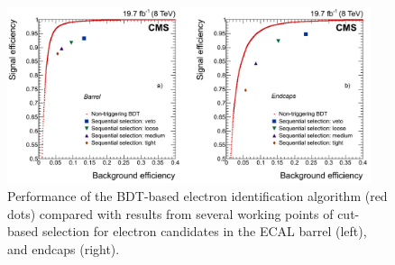 \begin{figure}[!htpb]\centering
 \includegraphics[width=0.95\textwidth]{plots_and_figures/chapter4/elec_eff.png}
\caption{Performance of the BDT-based electron identification algorithm (red dots) compared with results from several working points of cut-based selection for electron candidates in the ECAL barrel (left), and endcaps (right).}
 \label{fig:elec_eff}
\end{figure}










